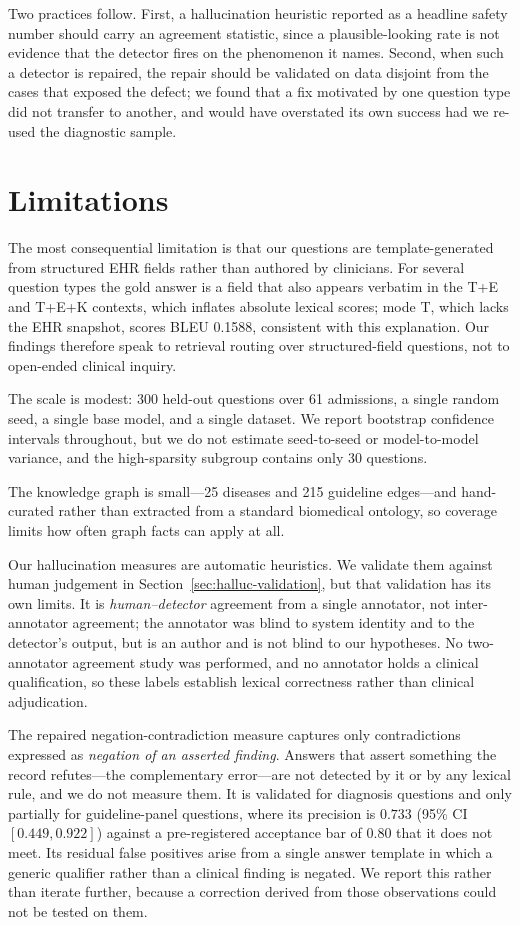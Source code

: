 \documentclass[preprint,12pt]{elsarticle}
\begin{document}
Two practices follow. First, a hallucination heuristic reported as a
headline safety number should carry an agreement statistic, since a
plausible-looking rate is not evidence that the detector fires on the
phenomenon it names. Second, when such a detector is repaired, the
repair should be validated on data disjoint from the cases that exposed
the defect; we found that a fix motivated by one question type did not
transfer to another, and would have overstated its own success had we
re-used the diagnostic sample.

\section{Limitations}
\label{sec:limitations}

The most consequential limitation is that our questions are
template-generated from structured EHR fields rather than authored by
clinicians. For several question types the gold answer is a field that
also appears verbatim in the T+E and T+E+K contexts, which inflates
absolute lexical scores; mode T, which lacks the EHR snapshot, scores
BLEU 0.1588, consistent with this explanation. Our findings therefore
speak to retrieval routing over structured-field questions, not to
open-ended clinical inquiry.

The scale is modest: 300 held-out questions over 61 admissions, a
single random seed, a single base model, and a single dataset. We
report bootstrap confidence intervals throughout, but we do not
estimate seed-to-seed or model-to-model variance, and the
high-sparsity subgroup contains only 30 questions.

The knowledge graph is small---25 diseases and 215 guideline
edges---and hand-curated rather than extracted from a standard
biomedical ontology, so coverage limits how often graph facts can
apply at all.

Our hallucination measures are automatic heuristics. We validate them
against human judgement in Section~\ref{sec:halluc-validation}, but that
validation has its own limits. It is \emph{human--detector} agreement
from a single annotator, not inter-annotator agreement; the annotator was
blind to system identity and to the detector's output, but is an author
and is not blind to our hypotheses. No two-annotator agreement study was
performed, and no annotator holds a clinical qualification, so these
labels establish lexical correctness rather than clinical adjudication.

The repaired negation-contradiction measure captures only contradictions
expressed as \emph{negation of an asserted finding}. Answers that assert
something the record refutes---the complementary error---are not detected
by it or by any lexical rule, and we do not measure them. It is validated
for diagnosis questions and only partially for guideline-panel questions,
where its precision is $0.733$ (95\% CI $[0.449, 0.922]$) against a
pre-registered acceptance bar of $0.80$ that it does not meet. Its
residual false positives arise from a single answer template in which a
generic qualifier rather than a clinical finding is negated. We report
this rather than iterate further, because a correction derived from those
observations could not be tested on them.
\end{document}
